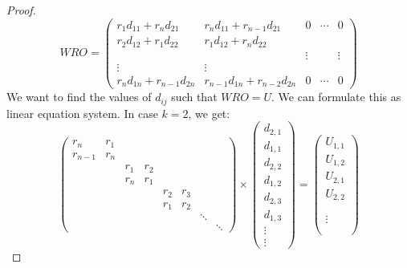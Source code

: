 \begin{proof}
\begin{equation}
  WRO = \left( \begin{array}{ccccc}
  r_{1}d_{11}+r_{n}d_{21} & r_{n}d_{11}+r_{n-1}d_{21} & 0 & \cdots & 0\\
  r_{2}d_{12}+r_{1}d_{22} & r_{1}d_{12}+r_{n}d_{22}\\
   &  & \vdots &  & \vdots\\
  \vdots & \vdots\\
  r_{n}d_{1n}+r_{n-1}d_{2n} & r_{n-1}d_{1n}+r_{n-2}d_{2n} & 0 & \cdots & 0
  \end{array}\right)
\end{equation}
We want to find the values of $d_{ij}$ such that $WRO=U$. We can formulate this as linear equation system. In case $k=2$, we get:
\begin{equation}
  \left(\begin{array}{cccccccc}
  r_{n} & r_{1}\\
  r_{n-1} & r_{n}\\
   &  & r_{1} & r_{2}\\
   &  & r_{n} & r_{1}\\
   &  &  &  & r_{2} & r_{3}\\
   &  &  &  & r_{1} & r_{2}\\
   &  &  &  &  &  & \ddots\\
   &  &  &  &  &  &  & \ddots
  \end{array}\right)\times\left(\begin{array}{c}
  d_{2,1}\\
  d_{1,1}\\
  d_{2,2}\\
  d_{1,2}\\
  d_{2,3}\\
  d_{1,3}\\
  \vdots\\
  \vdots
  \end{array}\right)=\left(\begin{array}{c}
  U_{1,1}\\
  U_{1,2}\\
  U_{2,1}\\
  U_{2,2}\\
  \\
  \\
  \vdots\\
  \\
  \end{array}\right)
\end{equation}


\end{proof}
